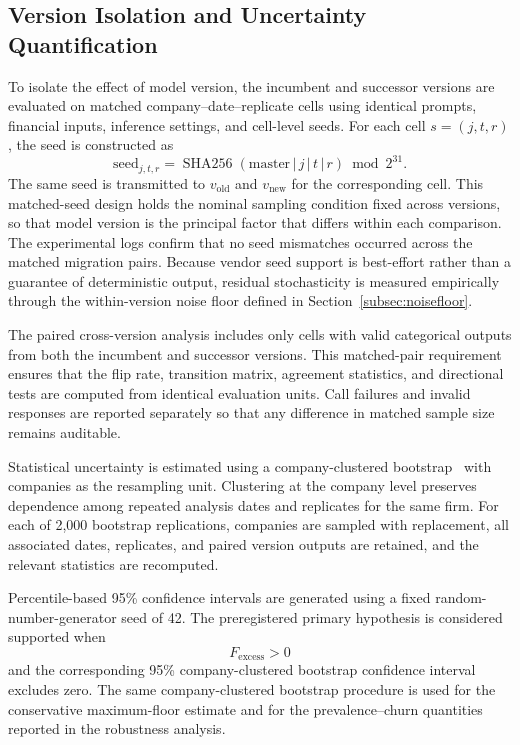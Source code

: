\documentclass{ieeeaccess}
\begin{document}
\subsection{Version Isolation and Uncertainty Quantification}
To isolate the effect of model version, the incumbent and successor versions are evaluated on matched company--date--replicate cells using identical prompts, financial inputs, inference settings, and cell-level seeds. For each cell $s=(j,t,r)$, the seed is constructed as
\begin{equation}
\mathrm{seed}_{j,t,r} = \operatorname{SHA256}(\mathrm{master}\,|\,j\,|\,t\,|\,r) \bmod 2^{31}.
\end{equation}
The same seed is transmitted to $v_{\mathrm{old}}$ and $v_{\mathrm{new}}$ for the corresponding cell. This matched-seed design holds the nominal sampling condition fixed across versions, so that model version is the principal factor that differs within each comparison. The experimental logs confirm that no seed mismatches occurred across the matched migration pairs. Because vendor seed support is best-effort rather than a guarantee of deterministic output, residual stochasticity is measured empirically through the within-version noise floor defined in Section~\ref{subsec:noisefloor}.

The paired cross-version analysis includes only cells with valid categorical outputs from both the incumbent and successor versions. This matched-pair requirement ensures that the flip rate, transition matrix, agreement statistics, and directional tests are computed from identical evaluation units. Call failures and invalid responses are reported separately so that any difference in matched sample size remains auditable.

Statistical uncertainty is estimated using a company-clustered bootstrap~\cite{efron} with companies as the resampling unit. Clustering at the company level preserves dependence among repeated analysis dates and replicates for the same firm. For each of 2{,}000 bootstrap replications, companies are sampled with replacement, all associated dates, replicates, and paired version outputs are retained, and the relevant statistics are recomputed.

Percentile-based 95\% confidence intervals are generated using a fixed random-number-generator seed of 42. The preregistered primary hypothesis is considered supported when
\begin{equation}
F_{\mathrm{excess}}>0
\end{equation}
and the corresponding 95\% company-clustered bootstrap confidence interval excludes zero. The same company-clustered bootstrap procedure is used for the conservative maximum-floor estimate and for the prevalence--churn quantities reported in the robustness analysis.
\end{document}
